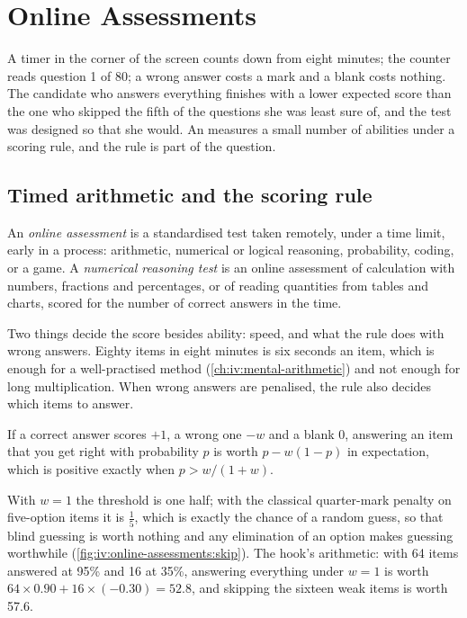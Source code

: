 \chapter{Online Assessments}\label{ch:iv:online-assessments}

A timer in the corner of the screen counts down from eight minutes; the counter reads question 1 of 80; a
wrong answer costs a mark and a blank costs nothing. The candidate who answers everything finishes with a lower
expected score than the one who skipped the fifth of the questions she was least sure of, and the test was
designed so that she would. An  measures a small number of abilities under a scoring rule,
and the rule is part of the question.

\section{Timed arithmetic and the scoring rule}

\begin{definition}\label{def:iv:online-assessments:oa}
An \emph{online assessment} is a standardised test taken remotely, under a time
limit, early in a process: arithmetic, numerical or logical reasoning, probability, coding, or a game. A
\emph{numerical reasoning test} is an online assessment of calculation with
numbers, fractions and percentages, or of reading quantities from tables and charts, scored for the number of
correct answers in the time.
\end{definition}

Two things decide the score besides ability: speed, and what the rule does with wrong answers. Eighty items in
eight minutes is six seconds an item, which is enough for a well-practised method
(\cref{ch:iv:mental-arithmetic}) and not enough for long multiplication. When wrong answers are penalised,
the rule also decides which items to answer.

\begin{proposition}\label{prop:iv:online-assessments:answer}
If a correct answer scores $+1$, a wrong one $-w$ and a blank 0, answering an item that you get right with
probability $p$ is worth $p - w(1-p)$ in expectation, which is positive exactly when $p > w/(1+w)$.
\end{proposition}

With $w = 1$ the threshold is one half; with the classical quarter-mark penalty on five-option items it is
$\tfrac15$, which is exactly the chance of a random guess, so that blind guessing is worth nothing and any
elimination of an option makes guessing worthwhile (\cref{fig:iv:online-assessments:skip}). The hook's
arithmetic: with 64 items answered at 95\% and 16 at 35\%, answering everything under $w = 1$ is worth $64
\times 0.90 + 16 \times (-0.30) = 52.8$, and skipping the sixteen weak items is worth 57.6.

